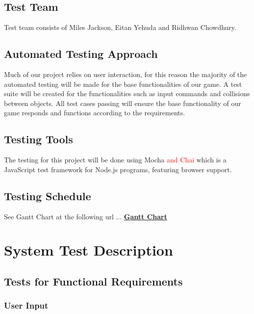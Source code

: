 \documentclass[12pt, titlepage]{article}
\begin{document}
\subsection{Test Team}
Test team consists of Miles Jackson, Eitan Yehuda and Ridhwan Chowdhury.

\subsection{Automated Testing Approach}
Much of our project relies on user interaction, for this reason the majority of the automated testing will be made for the base functionalities of our game. A test suite will be created  for the functionalities such as input commands and collisions between objects. All test cases passing will ensure the base functionality of our game responds and functions according to the requirements.
\subsection{Testing Tools}
The testing for this project will be done using Mocha \textcolor{red}{and Chai} which is a JavaScript test framework for Node.js programs, featuring browser support.

\subsection{Testing Schedule}
		
See Gantt Chart at the following url ...
\href{https://gitlab.cas.mcmaster.ca/chowdr11/3xa3/-/tree/master/BlankProjectTemplate/ProjectSchedule}
{\textbf{Gantt Chart}}\\

\section{System Test Description}
	
\subsection{Tests for Functional Requirements}

\subsubsection{User Input}
\end{document}
